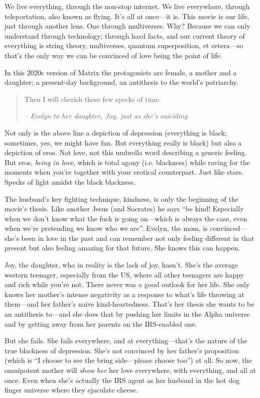 We live everything, through the non-stop internet. We live everywhere, through teleportation, also known as flying. It’s all at once—it is. This movie is our life, just through another lens. One through multiverses. Why? Because we can only understand through technology; through hard facts, and our current theory of everything is string theory, multiverses, quantum superposition, et cetera—so that’s the only way we can be convinced of love being the point of life.

In this 2020s version of Matrix the protagonists are female, a mother and a daughter; a present-day background, an antithesis to the world’s patriarchy.

\begin{quote}
    Then I will cherish these few specks of time.

    – \emph{Evelyn to her daughter, Joy, just as she’s suiciding}
\end{quote}

Not only is the above line a depiction of depression (everything is black; sometimes, yes, we might have fun. But everything really is black) but also a depiction of eros. Not love, not this umbrella word describing a generic feeling. But eros, \emph{being in love}, which is total agony (i.e. blackness) while raving for the moments when you’re together with your erotical counterpart. Just like stars. Specks of light amidst the black blackness.

The husband’s key fighting technique, kindness, is only the beginning of the movie’s thesis. Like another Jesus (and Socrates) he says “be kind! Especially when we don’t know what the fuck is going on—which is always the case, even when we’re pretending we know who we are”. Evelyn, the mom, is convinced—she’s been in love in the past and can remember not only feeling different in that present but also feeling amazing for that future. She knows this can happen.

Joy, the daughter, who in reality is the lack of joy, hasn’t. She’s the average western teenager, especially from the US, where all other teenagers are happy and rich while you’re not. There never was a good outlook for her life. She only knows her mother’s intense negativity as a response to what’s life throwing at them—and her father’s naive kind-heartedness. That’s her thesis she wants to be an antithesis to—and she does that by pushing her limits in the Alpha universe and by getting away from her parents on the IRS-enabled one.

But she fails. She fails everywhere, and at everything—that’s the nature of the true blackness of depression. She’s not convinced by her father’s proposition (which is “I choose to see the bring side—please choose too”) at all. So now, the omnipotent mother will \emph{show her} her love everywhere, with everything, and all at once. Even when she’s actually the IRS agent as her husband in the hot dog finger universe where they ejaculate cheese.

